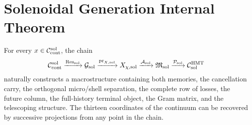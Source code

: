 \section{Solenoidal Generation Internal Theorem}
\label{sec:pdfv2-sol-theorem}

\begin{theorem}
\label{thm:pdfv2-sol-internal-generation}
For every \(x\in\mathcal C_{\rm cont}^{\rm sol}\), the chain
\[
 \mathcal C_{\rm cont}^{\rm sol}
 \xrightarrow{\operatorname{Res}_{\rm sol}}
 \mathcal G_{\rm sol}
 \xrightarrow{\operatorname{pr}_{X,{\rm sol}}}
 X_{\chi,{\rm sol}}
 \xrightarrow{\mathcal A_{\rm sol}}
 \mathfrak M_{\rm sol}
 \xrightarrow{\mathcal P_{\rm sol}}
 \mathcal C_{\rm sol}^{\rm HMT}
\]
naturally constructs a macrostructure containing both memories, the cancellation carry, the orthogonal micro/shell separation, the complete row of losses, the future column, the full-history terminal object, the Gram matrix, and the telescoping structure. The thirteen coordinates of the continuum can be recovered by successive projections from any point in the chain.
\end{theorem}

